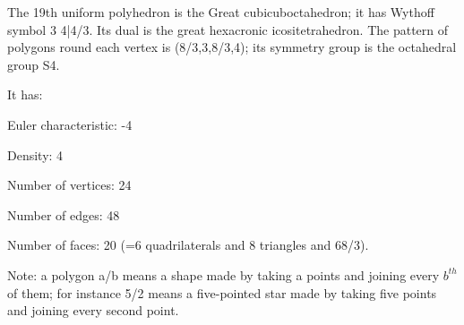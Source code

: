 The 19th uniform polyhedron is the Great cubicuboctahedron; it has Wythoff symbol 3 4|4/3. Its dual is the great hexacronic icositetrahedron. The pattern of polygons round each vertex is (8/3,3,8/3,4); its symmetry group is the octahedral group S4.\par
It has:\par
Euler characteristic: -4\par
Density: 4\par
Number of vertices: 24\par
Number of edges:  48\par
Number of faces: 20 (=6 quadrilaterals and 8 triangles and 6{8/3}).\par
Note: a polygon a/b means a shape made by taking a points and joining every $b^{th}$  of them; for instance 5/2 means a five-pointed star made by taking five points and joining every second point.